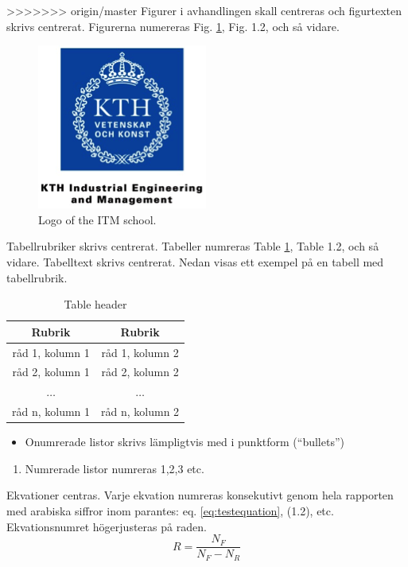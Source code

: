 \documentclass[a4paper,11pt]{kth-mag}
\begin{document}
>>>>>>> origin/master
Figurer i avhandlingen skall centreras och figurtexten skrivs centrerat. Figurerna numereras Fig. \ref{fig:kth_logo}, Fig. 1.2, och så vidare. 
\begin{figure}[htbp]
\begin{center}
\includegraphics{KTH_ITM_logo}
\caption{Logo of the ITM school.}
\label{fig:kth_logo}
\end{center}
\end{figure}

\noindent{}Tabellrubriker skrivs centrerat. Tabeller numreras Table \ref{tab:defaulttable}, Table 1.2, och så vidare. Tabelltext skrivs centrerat. Nedan visas ett exempel på en tabell med tabellrubrik.
\begin{table}[htdp]
\caption{Table header}
\begin{center}
\begin{tabular}{cc}
\toprule
Rubrik & Rubrik \\
\midrule
råd 1, kolumn 1 & råd 1, kolumn 2 \\
råd 2, kolumn 1 & råd 2, kolumn 2 \\
$\ldots$	       & $\ldots$ \\
råd n, kolumn 1 & råd n, kolumn 2 \\
\bottomrule
\end{tabular}
\end{center}
\label{tab:defaulttable}
\end{table}%


\begin{itemize}
\item Onumrerade listor skrivs lämpligtvis med i punktform (``bullets'')
\end{itemize}

\begin{enumerate}
\item Numrerade listor numreras 1,2,3 etc.
\end{enumerate}

\noindent{}Ekvationer centras. Varje ekvation numreras konsekutivt genom hela rapporten med arabiska siffror inom parantes: eq. \eqref{eq:testequation}, (1.2), etc. Ekvationsnumret högerjusteras på raden.
\begin{equation}
R= \frac{N_F}{N_F-N_R} \label{eq:testequation}
\end{equation}
\end{document}
